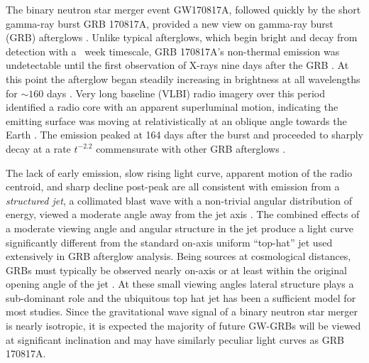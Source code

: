 \documentclass[twocolumn]{aastex62}
\newcommand{\gwbns}{GW170817A}
\newcommand{\grbbns}{GRB 170817A}
\begin{document}
The binary neutron star merger event \gwbns{}, followed quickly by the short gamma-ray burst \grbbns{}, provided a new view on gamma-ray burst (GRB) afterglows \citep{Abbott:2017ab, Abbott:2017ac}.  Unlike typical afterglows, which begin bright and decay from detection with a ~week timescale, \grbbns{}'s non-thermal emission was undetectable until the first observation of X-rays nine days after the GRB \citep{Troja:2017aa}.  At this point the afterglow began steadily increasing in brightness at all wavelengths for $\sim160$ days \citep{Haggard:2017aa, Hallinan:2017aa, DAvanzo:2018aa,  Lyman:2018aa, Margutti:2018aa, Mooley:2018aa, Troja:2018aa, Troja:2019ab}.  Very long baseline (VLBI) radio imagery over this period identified a radio core with an apparent superluminal motion, indicating the emitting surface was moving at relativistically at an oblique angle towards the Earth \citep{Mooley:2018ab}. The emission peaked at 164 days after the burst and proceeded to sharply decay at a rate $t^{-2.2}$ commensurate with other GRB afterglows \citep{Alexander:2018aa, Fong:2019aa, Lamb:2019aa, Mooley:2018ac, Troja:2019ab}.

The lack of early emission, slow rising light curve, apparent motion of the radio centroid, and sharp decline post-peak are all consistent with emission from a \emph{structured jet}, a collimated blast wave with a non-trivial angular distribution of energy, viewed a moderate angle away from the jet axis \citep{Lamb:2017aa, Alexander:2018aa, Hotokezaka:2018aa, Wu:2018aa, Xie:2018aa,  Ghirlanda:2019aa, Fong:2019aa, Lamb:2019aa, Troja:2019aa, Hajela:2019aa}.  The combined effects of a moderate viewing angle and angular structure in the jet produce a light curve significantly different from the standard on-axis uniform ``top-hat'' jet used extensively in GRB afterglow analysis. Being sources at cosmological distances, GRBs must typically be observed nearly on-axis or at least within the original opening angle of the jet \citep{Ryan:2015aa}. At these small viewing angles lateral structure plays a sub-dominant role and the ubiquitous top hat jet has been a sufficient model for most studies.  Since the gravitational wave signal of a binary neutron star merger is nearly isotropic, it is expected the majority of future GW-GRBs will be viewed at significant inclination and may have similarly peculiar light curves as \grbbns{}.
\end{document}
